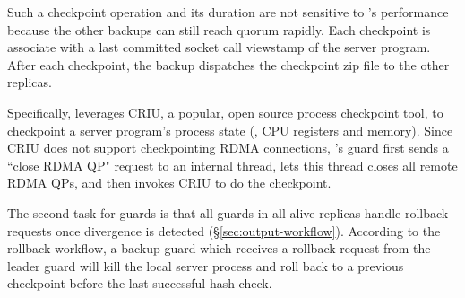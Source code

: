 Such a checkpoint operation and its duration are not sensitive to \xxx's 
performance because the other backups can still reach quorum rapidly. Each 
checkpoint is associate with a last committed socket call viewstamp of the 
server program. After each checkpoint, the backup dispatches the checkpoint zip 
file to the other replicas.

Specifically, \xxx leverages CRIU, a popular, open source process checkpoint 
tool, to checkpoint a server program's process state (\eg, CPU registers and 
memory). Since CRIU does not support checkpointing RDMA connections, \xxx's 
guard first sends a ``close RDMA QP" request to an \xxx internal thread, lets 
this thread closes all remote RDMA QPs, and then invokes CRIU to do the 
checkpoint.

The second task for guards is that all guards in all alive replicas handle 
rollback requests once divergence is detected (\S\ref{sec:output-workflow}). 
According to the rollback workflow, a backup guard which receives a rollback 
request from the leader guard will kill the local server process and roll back 
to a previous checkpoint before the last successful hash check.



